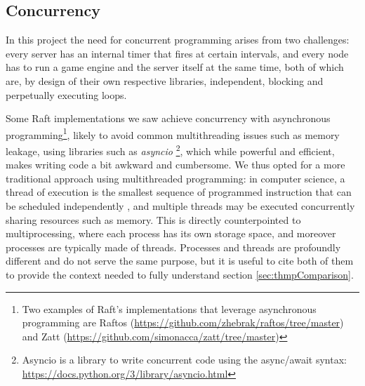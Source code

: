 \subsection{Concurrency} \label{sec:threading}

In this project the need for concurrent programming arises from two challenges: every server has an internal timer that fires at certain intervals, and every node has to run a game engine and the server itself at the same time, \textcolor{changes}{both of which are, by design of their own respective libraries, independent, blocking and perpetually executing loops.}

\textcolor{changes}{Some Raft implementations we saw achieve concurrency with asynchronous programming\footnote{Two examples of Raft's implementations that leverage asynchronous programming are Raftos (\url{https://github.com/zhebrak/raftos/tree/master}) and Zatt (\url{https://github.com/simonacca/zatt/tree/master})}, likely to avoid common multithreading issues such as memory leakage}, using libraries such as \textit{asyncio} \footnote{Asyncio is a library to write concurrent code using the async/await syntax: \url{https://docs.python.org/3/library/asyncio.html}}, which while powerful and efficient, makes writing code a bit awkward and cumbersome. We thus opted for a more traditional approach using multithreaded programming: in computer science, a thread of execution is the smallest sequence of programmed instruction that can be \textcolor{changes}{scheduled independently} \cite{lamportMultiprocessor}, and multiple threads may be executed concurrently sharing resources such as memory. \textcolor{changes}{This} is directly counterpointed to multiprocessing, where each process has its own storage space, and moreover processes are typically made of threads. \textcolor{changes}{Processes and threads are profoundly different and do not serve the same purpose, but it is useful to cite both of them to provide the context needed to fully understand section \ref{sec:thmpComparison}}.

